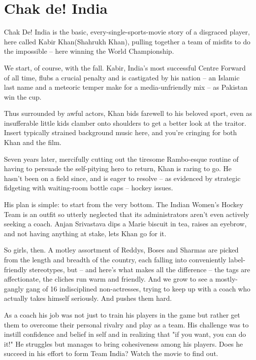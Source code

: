 \documentclass[11pt]{article} %
\begin{document}
\section{Chak de! India}
Chak De! India is the basic, every-single-sports-movie story of a disgraced player, here called Kabir Khan(Shahrukh Khan), pulling together a team of misfits to do the impossible -- here winning the World Championship. 

We start, of course, with the fall. Kabir, India's most successful Centre Forward of all time, flubs a crucial penalty and is castigated by his nation -- an Islamic last name and a meteoric temper make for a media-unfriendly mix -- as Pakistan win the cup.

Thus surrounded by awful actors, Khan bids farewell to his beloved sport, even as insufferable little kids clamber onto shoulders to get a better look at the traitor. Insert typically strained background music here, and you're cringing for both Khan and the film.

Seven years later, mercifully cutting out the tiresome Rambo-esque routine of having to persuade the self-pitying hero to return, Khan is raring to go. He hasn't been on a field since, and is eager to resolve -- as evidenced by strategic fidgeting with waiting-room bottle caps -- hockey issues.

His plan is simple: to start from the very bottom. The Indian Women's Hockey Team is an outfit so utterly neglected that its administrators aren't even actively seeking a coach. Anjan Srivastava dips a Marie biscuit in tea, raises an eyebrow, and not having anything at stake, lets Khan go for it.

So girls, then. A motley assortment of Reddys, Boses and Sharmas are picked from the length and breadth of the country, each falling into conveniently label-friendly stereotypes, but -- and here's what makes all the difference -- the tags are affectionate, the cliches run warm and friendly. And we grow to see a mostly-gangly gang of 16 indisciplined non-actresses, trying to keep up with a coach who actually takes himself seriously. And pushes them hard.

As a coach his job was not just to train his players in the game but rather get them to overcome their personal rivalry and play as a team. His challenge was to instill confidence and belief in self and in realizing that "if you want, you can do it!" He struggles but manages to bring cohesiveness among his players. Does he succeed in his effort to form Team India? Watch the movie to find out.
\end{document}
